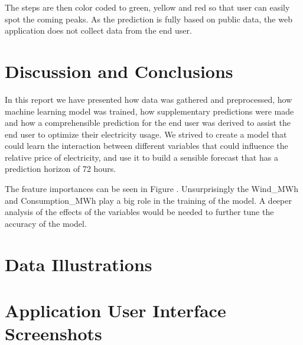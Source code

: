 \documentclass{article}
\begin{document}
The steps are then color coded to green, yellow and red so that user can easily spot the coming peaks. As the prediction is fully based on public data, the web application does not collect data from the end user.

\section{Discussion and Conclusions}
\label{section:conclusions}

In this report we have presented how data was gathered and preprocessed, how machine learning model was trained, how supplementary predictions were made and how a comprehensible prediction for the end user was derived to assist the end user to optimize their electricity usage. We strived to create a model that could learn the interaction between different variables that could influence the relative price of electricity, and use it to build a sensible forecast that has a prediction horizon of 72 hours.

The feature importances can be seen in Figure . Unsurprisingly the Wind\_MWh and Consumption\_MWh play a big role in the training of the model. A deeper analysis of the effects of the variables would be needed to further tune the accuracy of the model.



\appendix
\section{Data Illustrations}

\label{section:appendixa}

\section{Application User Interface Screenshots}

\label{section:appendixb}
\end{document}
